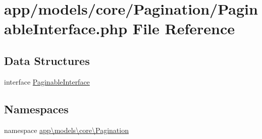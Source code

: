 \hypertarget{_paginable_interface_8php}{\section{app/models/core/\-Pagination/\-Paginable\-Interface.php File Reference}
\label{_paginable_interface_8php}
}
\subsection*{Data Structures}
\begin{DoxyCompactItemize}
\item 
interface \hyperlink{interfaceapp_1_1models_1_1core_1_1_pagination_1_1_paginable_interface}{Paginable\-Interface}
\end{DoxyCompactItemize}
\subsection*{Namespaces}
\begin{DoxyCompactItemize}
\item 
namespace \hyperlink{namespaceapp_1_1models_1_1core_1_1_pagination}{app\textbackslash{}models\textbackslash{}core\textbackslash{}\-Pagination}
\end{DoxyCompactItemize}
